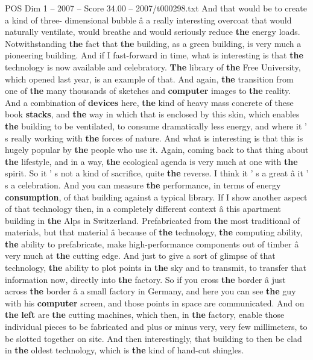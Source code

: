\begin{textsample}{POS Dim 1 – 2007 – Score 34.00 – 2007/t000298.txt}
And that would be to create a kind of three- dimensional bubble â a really interesting overcoat that would naturally ventilate, would breathe and would seriously reduce \textbf{the} energy loads.
Notwithstanding \textbf{the} fact that \textbf{the} building, as a green building, is very much a pioneering building.
And if I fast-forward in time, what is interesting is that \textbf{the} technology is now available and celebratory. \textbf{The} library of \textbf{the} Free University, which opened last year, is an example of that.
And again, \textbf{the} transition from one of \textbf{the} many thousands of sketches and \textbf{computer} images to \textbf{the} reality.
And a combination of \textbf{devices} here, \textbf{the} kind of heavy mass concrete of these book \textbf{stacks}, and \textbf{the} way in which that is enclosed by this skin, which enables \textbf{the} building to be ventilated, to consume dramatically less energy, and where it ' s really working with \textbf{the} forces of nature.
And what is interesting is that this is hugely popular by \textbf{the} people who use it.
Again, coming back to that thing about \textbf{the} lifestyle, and in a way, \textbf{the} ecological agenda is very much at one with \textbf{the} spirit.
So it ' s not a kind of sacrifice, quite \textbf{the} reverse.
I think it ' s a great â it ' s a celebration.
And you can measure \textbf{the} performance, in terms of energy \textbf{consumption}, of that building against a typical library.
If I show another aspect of that technology then, in a completely different context â this apartment building in \textbf{the} Alps in Switzerland.
Prefabricated from \textbf{the} most traditional of materials, but that material â because of \textbf{the} technology, \textbf{the} computing ability, \textbf{the} ability to prefabricate, make high-performance components out of timber â very much at \textbf{the} cutting edge.
And just to give a sort of glimpse of that technology, \textbf{the} ability to plot points in \textbf{the} sky and to transmit, to transfer that information now, directly into \textbf{the} factory.
So if you cross \textbf{the} border â just across \textbf{the} border â a small factory in Germany, and here you can see \textbf{the} guy with his \textbf{computer} screen, and those points in space are communicated.
And on \textbf{the} \textbf{left} are \textbf{the} cutting machines, which then, in \textbf{the} factory, enable those individual pieces to be fabricated and plus or minus very, very few millimeters, to be slotted together on site.
And then interestingly, that building to then be clad in \textbf{the} oldest technology, which is \textbf{the} kind of hand-cut shingles.

\end{textsample}

